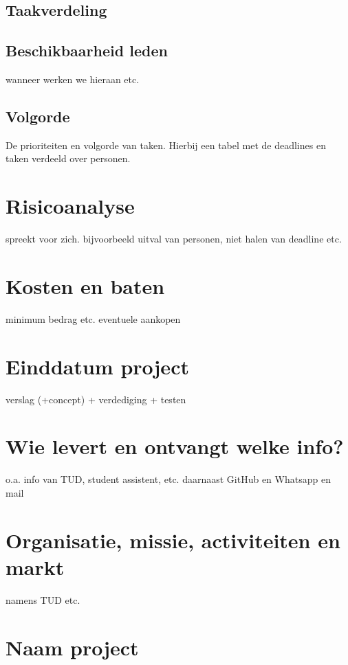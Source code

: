 \documentclass[11pt,twoside,a4paper]{article}
\begin{document}
\subsection{Taakverdeling}

\subsection{Beschikbaarheid leden}
wanneer werken we hieraan etc.

\subsection{Volgorde}
De prioriteiten en volgorde van taken.
Hierbij een tabel met de deadlines en taken verdeeld over personen.\newline


\section{Risicoanalyse}
spreekt voor zich. bijvoorbeeld uitval van personen, niet halen van deadline etc.
\newline

\section{Kosten en baten}
minimum bedrag etc. eventuele aankopen\newline

\section{Einddatum project}
verslag (+concept) + verdediging + testen\newline

\section{Wie levert en ontvangt welke info?}
o.a. info van TUD, student assistent, etc.
daarnaast GitHub en Whatsapp en mail\newline

\section{Organisatie, missie, activiteiten en markt}
namens TUD etc.\newline

\section{Naam project}
\end{document}
